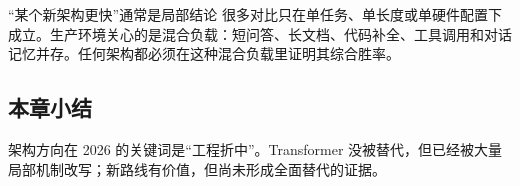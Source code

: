 \begin{warningbox}{“某个新架构更快”通常是局部结论}
很多对比只在单任务、单长度或单硬件配置下成立。生产环境关心的是混合负载：短问答、长文档、代码补全、工具调用和对话记忆并存。任何架构都必须在这种混合负载里证明其综合胜率。
\end{warningbox}

\subsection{本章小结}

架构方向在 2026 的关键词是“工程折中”。Transformer 没被替代，但已经被大量局部机制改写；新路线有价值，但尚未形成全面替代的证据。

